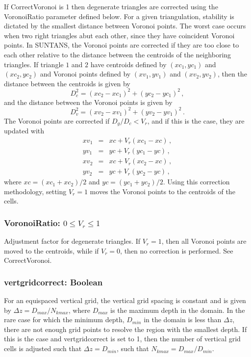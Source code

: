 \documentclass[12pt,oneside]{article}
\begin{document}
If CorrectVoronoi is 1 then degenerate triangles are corrected using
the VoronoiRatio parameter defined below.  For a given triangulation,
stability is dictated by the smallest distance between Voronoi
points.  The worst case occurs when two right triangles abut each
other, since they have coincident Voronoi points.  In SUNTANS, the
Voronoi points are corrected if they are too close to each other
relative to the distance between the centroids of the neighboring triangles.
If triangle $1$ and $2$ have centroids defined by $(xc_1,yc_1)$ and $(xc_2,yc_2)$
and Voronoi points defined by $(xv_1,yv_1)$ and $(xv_2,yv_2)$, then the distance
between the centroids is given by
\[
D_c^2 = (xc_2-xc_1)^2 + (yc_2-yc_1)^2\,,
\]
and the distance between the Voronoi points is given by
\[
D_v^2 = (xv_2-xv_1)^2 + (yv_2-yv_1)^2\,.
\]
The Voronoi points are corrected if $D_g/D_c< V_r$, and if this
is the case, they are updated with
\begin{eqnarray}
xv_1 &=& xc + V_r(xc_1-xc)\,,\nonumber\\
yv_1 &=& yc + V_r(yc_1-yc)\,,\nonumber\\
xv_2 &=& xc + V_r(xc_2-xc)\,,\nonumber\\
yv_2 &=& yc + V_r(yc_2-yc)\,,\nonumber
\end{eqnarray}
where $xc=(xc_1+xc_2)/2$ and $yc=(yc_1+yc_2)/2$.  Using this correction methodology,
setting $V_r=1$ moves the Voronoi points to the centroids of the cells.

\subsubsection{VoronoiRatio: $0\le V_r\le 1$}

Adjustment factor for degenerate triangles.  If $V_r=1$, then
all Voronoi points are moved to the centroids, while if $V_r=0$, 
then no correction is performed.  See CorrectVoronoi.

\subsubsection{vertgridcorrect: Boolean}

For an equispaced vertical grid, the vertical grid spacing is constant and
is given by $\Delta z=D_{max}/N_{kmax}$, where $D_{max}$ is the maximum depth in the domain.
In the rare case for which the minimum depth, $D_{min}$ in the domain is less than $\Delta z$, there
are not enough grid points to resolve the region with the smallest depth.  If this is the
case and vertgridcorrect
is set to 1, then the number of vertical grid cells is adjusted such that $\Delta z=D_{min}$,
such that $N_{kmax}=D_{max}/D_{min}$.
\end{document}

